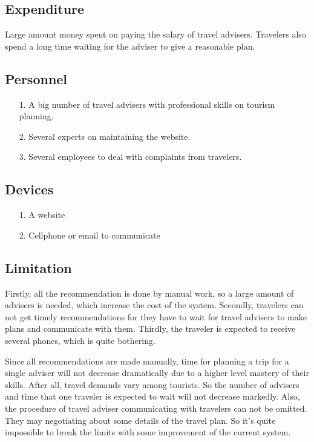 \documentclass[10pt]{article}
\begin{document}
\subsection{Expenditure}
Large amount money spent on paying the salary of travel advisers. Travelers also spend a long time waiting for the adviser to give a reasonable plan.

\subsection{Personnel}
\begin{itemize}
  \item[1.] A big number of travel advisers with professional skills on tourism planning.
  \item[2.] Several experts on maintaining the website.
  \item[3.] Several employees to deal with complaints from travelers. 
\end{itemize}

\subsection{Devices}
\begin{itemize}
  \item[1.] A website
  \item[2.] Cellphone or email to communicate 
\end{itemize}

\subsection{Limitation}
Firstly, all the recommendation is done by manual work, so a large amount of advisers is needed, which increase the cost of the system. Secondly, travelers can not get timely recommendations for they have to wait for travel advisers to make plans and communicate with them. Thirdly, the traveler is expected to receive several phones, which is quite bothering. 

Since all recommendations are made manually, time for planning a trip for a single adviser will not decrease dramatically due to a higher level mastery of their skills. After all, travel demands vary among tourists. So the number of advisers and time that one traveler is expected to wait will not decrease markedly. Also, the procedure of travel adviser communicating with travelers can not be omitted. They may negotiating about some details of the travel plan. So it’s quite impossible to break the limits with some improvement of the current system.
\end{document}

